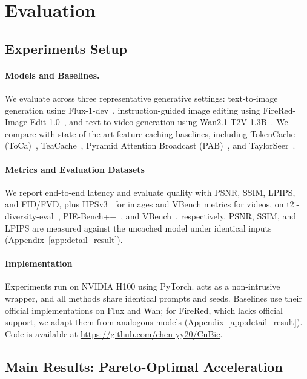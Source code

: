 \section{Evaluation}
\subsection{Experiments Setup}
\paragraph{Models and Baselines.}
We evaluate \cubic across three representative generative settings: text-to-image generation using Flux-1-dev~\cite{flux}, instruction-guided image editing using FireRed-Image-Edit-1.0~\cite{firered}, and text-to-video generation using Wan2.1-T2V-1.3B~\cite{wan}. We compare with state-of-the-art feature caching baselines, including TokenCache (ToCa)~\cite{tokencache}, TeaCache~\cite{teacache}, Pyramid Attention Broadcast (PAB)~\cite{pab}, and TaylorSeer~\cite{taylorseer}. 

\paragraph{Metrics and Evaluation Datasets}
We report end-to-end latency and evaluate quality with PSNR, SSIM, LPIPS, and FID/FVD, plus HPSv3~\cite{HPSv3} for images and VBench metrics for videos, on t2i-diversity-eval~\cite{brack2025howtotrain}, PIE-Bench++~\cite{Pie_bench}, and VBench~\cite{vbench}, respectively. PSNR, SSIM, and LPIPS are measured against the uncached model under identical inputs (Appendix~\ref{app:detail_result}).

\paragraph{Implementation} 
\label{sec:Implementation}
Experiments run on NVIDIA H100 using PyTorch. \cubic acts as a non-intrusive wrapper, and all methods share identical prompts and seeds. Baselines use their official implementations on Flux and Wan; for FireRed, which lacks official support, we adapt them from analogous models (Appendix~\ref{app:detail_result}). Code is available at \url{https://github.com/chen-yy20/CuBic}.

\subsection{Main Results: Pareto-Optimal Acceleration}
